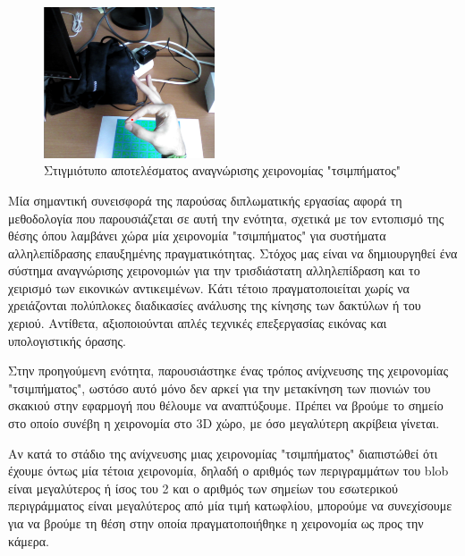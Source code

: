 \begin{figure}[H]
    \centering
    \includegraphics[width=0.45\textwidth]{Files/Figures/pinch.png}
    \caption[Στιγμιότυπο αποτελέσματος αναγνώρισης χειρονομίας "τσιμπήματος"]{Στιγμιότυπο αποτελέσματος αναγνώρισης χειρονομίας "τσιμπήματος"}
    \label{fig:pinch results}
\end{figure}








Μία σημαντική συνεισφορά της παρούσας διπλωματικής εργασίας αφορά τη μεθοδολογία που παρουσιάζεται σε αυτή την ενότητα, σχετικά με τον εντοπισμό της θέσης όπου λαμβάνει χώρα μία χειρονομία "τσιμπήματος" για συστήματα αλληλεπίδρασης επαυξημένης πραγματικότητας. Στόχος μας είναι να δημιουργηθεί ένα σύστημα αναγνώρισης χειρονομιών για την τρισδιάστατη αλληλεπίδραση και το χειρισμό των εικονικών αντικειμένων. Κάτι τέτοιο πραγματοποιείται χωρίς να χρειάζονται πολύπλοκες διαδικασίες ανάλυσης της κίνησης των δακτύλων ή του χεριού. Αντίθετα, αξιοποιούνται απλές τεχνικές επεξεργασίας εικόνας και υπολογιστικής όρασης.


Στην προηγούμενη ενότητα, παρουσιάστηκε ένας τρόπος ανίχνευσης της χειρονομίας "τσιμπήματος", ωστόσο αυτό μόνο δεν αρκεί για την μετακίνηση των πιονιών του σκακιού στην εφαρμογή που θέλουμε να αναπτύξουμε. Πρέπει να βρούμε το σημείο στο οποίο συνέβη η χειρονομία στο 3D χώρο, με όσο μεγαλύτερη ακρίβεια γίνεται. 



Αν κατά το στάδιο της ανίχνευσης μιας χειρονομίας "τσιμπήματος" διαπιστώθεί ότι έχουμε όντως μία τέτοια χειρονομία, δηλαδή ο αριθμός των περιγραμμάτων του blob είναι μεγαλύτερος ή ίσος του 2 και ο αριθμός των σημείων του εσωτερικού περιγράμματος είναι μεγαλύτερος από μία τιμή κατωφλίου, μπορούμε να συνεχίσουμε για να βρούμε τη θέση στην οποία πραγματοποιήθηκε η χειρονομία ως προς την κάμερα.

